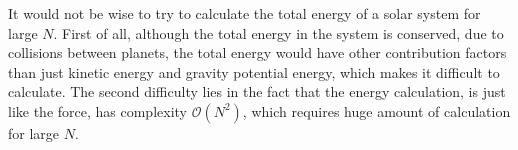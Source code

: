 It would not be wise to try to calculate the total energy of a solar system for large $N$. First of all, although the total energy in the system is conserved, due to collisions between planets, the total energy would have other contribution factors than just kinetic energy and gravity potential energy, which makes it difficult to calculate. The second difficulty lies in the fact that the energy calculation, is just like the force, has complexity $\mathcal{O}(N^2)$, which requires huge amount of calculation for large $N$.